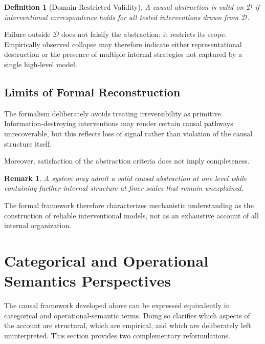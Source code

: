 \documentclass[11pt]{article}
\newtheorem{definition}{Definition}
\newtheorem{remark}{Remark}
\begin{document}
\begin{definition}[Domain-Restricted Validity]
A causal abstraction is valid on $\mathcal{D}$ if interventional correspondence holds for all tested interventions drawn from $\mathcal{D}$.
\end{definition}

Failure outside $\mathcal{D}$ does not falsify the abstraction; it restricts its scope. Empirically observed collapse may therefore indicate either representational destruction or the presence of multiple internal strategies not captured by a single high-level model.

\subsection{Limits of Formal Reconstruction}

The formalism deliberately avoids treating irreversibility as primitive. Information-destroying interventions may render certain causal pathways unrecoverable, but this reflects loss of signal rather than violation of the causal structure itself.

Moreover, satisfaction of the abstraction criteria does not imply completeness.

\begin{remark}
A system may admit a valid causal abstraction at one level while containing further internal structure at finer scales that remain unexplained.
\end{remark}

The formal framework therefore characterizes mechanistic understanding as the construction of reliable interventional models, not as an exhaustive account of all internal organization.

\section{Categorical and Operational Semantics Perspectives}

The causal framework developed above can be expressed equivalently in categorical and operational-semantic terms. Doing so clarifies which aspects of the account are structural, which are empirical, and which are deliberately left uninterpreted. This section provides two complementary reformulations.
\end{document}
